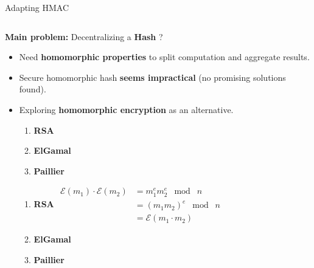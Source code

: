 \begin{frame}{Adapting HMAC}

\begin{columns} 
\begin{column}{0.5\textwidth}
    {\small \textbf{Main problem:} Decentralizing a \textbf{\color{red}Hash} ?} \newline

    \begin{itemize}
        \setlength\itemsep{2mm}
        \item Need \textbf{homomorphic properties} \newline 
        to split computation and aggregate results.
        \item Secure homomorphic hash \textbf{seems impractical} \newline
        (no promising solutions found).
        \item Exploring \textbf{homomorphic encryption} as an alternative.
         {
            \begin{enumerate}\scriptsize
                \setlength\itemsep{3mm}
                \item \textbf{RSA}
                \item \textbf{ElGamal}
                \item \textbf{Paillier}
            \end{enumerate}
        }  {
            \begin{enumerate}\scriptsize
                \setlength\itemsep{3mm}
                \item \textbf{RSA}\vspace{2mm}\newline
                $\begin{aligned}
                    {\mathcal {E}}(m_{1}) \cdot {\mathcal {E}}(m_{2})
                    &=m_{1}^{e}m_{2}^{e}\;{\bmod {\;}}n\\[6pt]
                    &=(m_{1}m_{2})^{e}\;{\bmod {\;}}n\\[6pt]
                    &={\mathcal {E}}(m_{1}\cdot m_{2})
                \end{aligned}$
                \item \textbf{ElGamal}
                \item \textbf{Paillier}
            \end{enumerate}
        }  {
            \begin{enumerate}\scriptsize

\end{enumerate}}
\end{itemize}
\end{column}
\end{columns}
\end{frame}
